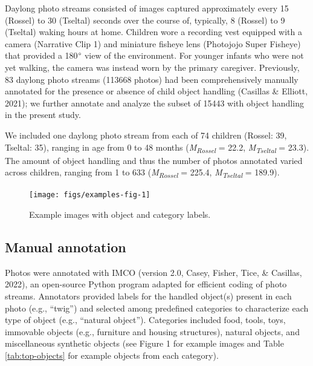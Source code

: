 \documentclass[10pt, letterpaper]{article}
\newenvironment{CodeChunk}{}{}
\begin{document}
Daylong photo streams consisted of images captured approximately every
15 (Rossel) to 30 (Tseltal) seconds over the course of, typically, 8
(Rossel) to 9 (Tseltal) waking hours at home. Children wore a recording
vest equipped with a camera (Narrative Clip 1) and miniature fisheye
lens (Photojojo Super Fisheye) that provided a 180\(\text{\textdegree}\)
view of the environment. For younger infants who were not yet walking,
the camera was instead worn by the primary caregiver. Previously, 83
daylong photo streams (113668 photos) had been comprehensively manually
annotated for the presence or absence of child object handling (Casillas
\& Elliott, 2021); we further annotate and analyze the subset of 15443
with object handling in the present study.

We included one daylong photo stream from each of 74 children (Rossel:
39, Tseltal: 35), ranging in age from 0 to 48 months
(\emph{M}\textsubscript{\emph{Rossel}} = 22.2,
\emph{M}\textsubscript{\emph{Tseltal}} = 23.3). The amount of object
handling and thus the number of photos annotated varied across children,
ranging from 1 to 633 (\emph{M}\textsubscript{\emph{Rossel}} = 225.4,
\emph{M}\textsubscript{\emph{Tseltal}} = 189.9).

\begin{CodeChunk}
\begin{figure}[h]

{\centering \texttt{[image: figs/examples-fig-1]} 

}

\caption[Example images with object and category labels]{Example images with object and category labels.}\label{fig:examples-fig}
\end{figure}
\end{CodeChunk}

\hypertarget{manual-annotation}{%
\subsection{Manual annotation}\label{manual-annotation}}

Photos were annotated with IMCO (version 2.0, Casey, Fisher, Tice, \&
Casillas, 2022), an open-source Python program adapted for efficient
coding of photo streams. Annotators provided labels for the handled
object(s) present in each photo (e.g., ``twig'') and selected among
predefined categories to characterize each type of object (e.g.,
``natural object''). Categories included food, tools, toys, immovable
objects (e.g., furniture and housing structures), natural objects, and
miscellaneous synthetic objects (see Figure 1 for example images and
Table \ref{tab:top-objects} for example objects from each category).
\end{document}
